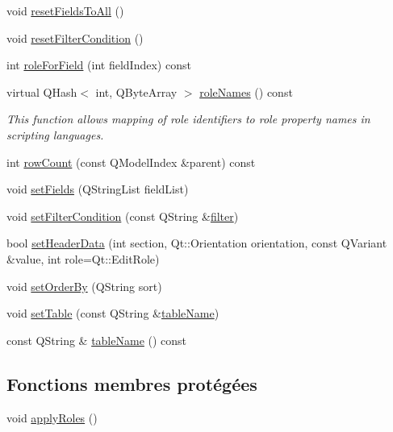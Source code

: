 \begin{DoxyCompactItemize}
\item 
void \hyperlink{classSimpleHotel_1_1SH__SqlDataModel_aa27ed72a82ba857af52d0f9665768fc0}{reset\-Fields\-To\-All} ()
\item 
void \hyperlink{classSimpleHotel_1_1SH__SqlDataModel_a50db9acfb9b111f76c020468f14cb86c}{reset\-Filter\-Condition} ()
\item 
int \hyperlink{classSimpleHotel_1_1SH__SqlDataModel_adc99fa53df4371dc658b3abe8d8b4752}{role\-For\-Field} (int field\-Index) const 
\item 
virtual Q\-Hash$<$ int, Q\-Byte\-Array $>$ \hyperlink{classSimpleHotel_1_1SH__SqlDataModel_a9619093c8f2f1aa6a709da1954bba2e5}{role\-Names} () const 
\begin{DoxyCompactList}\small\item\em This function allows mapping of role identifiers to role property names in scripting languages. \end{DoxyCompactList}\item 
int \hyperlink{classSimpleHotel_1_1SH__SqlDataModel_a594b2b5d67b8e2f4140f93a7e34aefc3}{row\-Count} (const Q\-Model\-Index \&parent) const 
\item 
void \hyperlink{classSimpleHotel_1_1SH__SqlDataModel_a70bdb5d69f0709cdea2c17f257089f91}{set\-Fields} (Q\-String\-List field\-List)
\item 
void \hyperlink{classSimpleHotel_1_1SH__SqlDataModel_ad28581e259f10824eb652c08c092fe58}{set\-Filter\-Condition} (const Q\-String \&\hyperlink{classSimpleHotel_1_1SH__SqlDataModel_ae7c93067c3e3fbbff663a407d4e8e4b4}{filter})
\item 
bool \hyperlink{classSimpleHotel_1_1SH__SqlDataModel_af0af2d450bd8de03a7c62f7cd6514610}{set\-Header\-Data} (int section, Qt\-::\-Orientation orientation, const Q\-Variant \&value, int role=Qt\-::\-Edit\-Role)
\item 
void \hyperlink{classSimpleHotel_1_1SH__SqlDataModel_a73ff28608bc0585fc8987e7a6ff907bb}{set\-Order\-By} (Q\-String sort)
\item 
void \hyperlink{classSimpleHotel_1_1SH__SqlDataModel_ace12600fa4540dbff661d80318a81d04}{set\-Table} (const Q\-String \&\hyperlink{classSimpleHotel_1_1SH__SqlDataModel_a9228179700c32feac1ec5a495ca36f9f}{table\-Name})
\item 
const Q\-String \& \hyperlink{classSimpleHotel_1_1SH__SqlDataModel_a9228179700c32feac1ec5a495ca36f9f}{table\-Name} () const 
\end{DoxyCompactItemize}
\subsection*{Fonctions membres protégées}
\begin{DoxyCompactItemize}
\item 
void \hyperlink{classSimpleHotel_1_1SH__SqlDataModel_a8de3952fd015f7ef4f8f079cb729306d}{apply\-Roles} ()
\end{DoxyCompactItemize}
